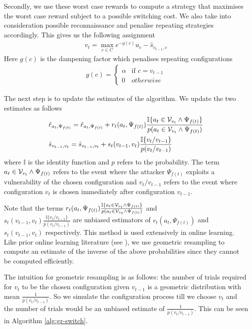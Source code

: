 Secondly, we use these worst case rewards to compute a strategy that maximises the worst case reward subject to a possible switching cost. We also take into consideration possible reconnaissance and penalise repeating strategies accordingly. This gives us the following assignment
\begin{align*}
    v_t = \max_{c \in C} e^{-g(c)} u_c - \hat{s}_{v_{t-1}, c}
\end{align*}
Here $g(c)$ is the dampening factor which penalises repeating configurations
\begin{align*}
    g(c) = 
    \begin{cases}
        \alpha & \text{if } c = v_{t-1} \\
        0 & otherwise
    \end{cases}
\end{align*}

The next step is to update the estimates of the algorithm. We update the two estimates as follows
\begin{align*}
    &\hat{r}_{a_t, \Psi_{f(t)}} = \hat{r}_{a_t, \Psi_{f(t)}} + r_t(a_t, \Psi_{f(t)})\frac{\mathbb{I}\{a_t \in \cal V_{v_t} \land \Psi_{f(t)}\}}{p(a_t \in \cal V_{v_t} \land \Psi_{f(t)})} \\
    &\hat{s}_{v_{t-1}, v_t} = \hat{s}_{v_{t-1}, v_t} + s_t(v_{t-1}, v_t)\frac{\mathbb{I}\{v_t/v_{t-1}\}}{p(v_t/v_{t-1})}
\end{align*}
where $\mathbb{I}$ is the identity function and $p$ refers to the probability. The term $a_t \in \cal V_{v_t} \land \Psi_{f(t)}$ refers to the event where the attacker $\Psi_{f(t)}$ exploits a vulnerability of the chosen configuration and $v_t/v_{t-1}$ refers to the event where configuration $v_t$ is chosen immediately after configuration $v_{t-1}$. 

Note that the terms $r_t(a_t, \Psi_{f(t)})\frac{\mathbb{I}\{a_t \in \cal V_{v_t} \land \Psi_{f(t)}\}}{p(a_t \in \cal V_{v_t} \land \Psi_{f(t)})}$ and \\ $s_t(v_{t-1}, v_t)\frac{\mathbb{I}\{v_t/v_{t-1}\}}{p(v_t/v_{t-1})}$ are unbiased estimators of $r_t(a_t, \Psi_{f(t)})$ and $s_t(v_{t-1}, v_t)$ respectively. This method is used extensively in online learning. Like prior online learning literature (see \cite{neuandbartok2013fpl}), we use geometric resampling to compute an estimate of the inverse of the above probabilities since they cannot be computed efficiently. 

The intuition for geometric resampling is as follows: the number of trials required for $v_t$ to be the chosen configuration given $v_{t-1}$ is a geometric distribution with mean $\frac{1}{p(v_t/v_{t-1})}$. So we simulate the configuration process till we choose $v_t$ and the number of trials would be an unbiased estimate of $\frac{1}{p(v_t/v_{t-1})}$. This can be seen in Algorithm \ref{alg:gr-switch}.

